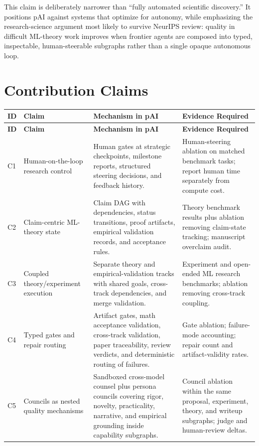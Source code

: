 \documentclass[11pt]{article}
\newcommand{\pai}{pAI}
\begin{document}
This claim is deliberately narrower than ``fully automated scientific discovery.'' It positions \pai{} against systems that optimize for autonomy, while emphasizing the research-science argument most likely to survive NeurIPS review: quality in difficult ML-theory work improves when frontier agents are composed into typed, inspectable, human-steerable subgraphs rather than a single opaque autonomous loop.

\section*{Contribution Claims}

\begin{longtable}{>{\raggedright\arraybackslash}p{} >{\raggedright\arraybackslash}p{} >{\raggedright\arraybackslash}p{} >{\raggedright\arraybackslash}p{}}
\toprule
\textbf{ID} & \textbf{Claim} & \textbf{Mechanism in \pai{}} & \textbf{Evidence Required} \\
\midrule
\endfirsthead
\toprule
\textbf{ID} & \textbf{Claim} & \textbf{Mechanism in \pai{}} & \textbf{Evidence Required} \\
\midrule
\endhead
C1 & Human-on-the-loop research control & Human gates at strategic checkpoints, milestone reports, structured steering decisions, and feedback history. & Human-steering ablation on matched benchmark tasks; report human time separately from compute cost. \\
C2 & Claim-centric ML-theory state & Claim DAG with dependencies, status transitions, proof artifacts, empirical validation records, and acceptance rules. & Theory benchmark results plus ablation removing claim-state tracking; manuscript overclaim audit. \\
C3 & Coupled theory/experiment execution & Separate theory and empirical-validation tracks with shared goals, cross-track dependencies, and merge validation. & Experiment and open-ended ML research benchmarks; ablation removing cross-track coupling. \\
C4 & Typed gates and repair routing & Artifact gates, math acceptance validation, cross-track validation, paper traceability, review verdicts, and deterministic routing of failures. & Gate ablation; failure-mode accounting; repair count and artifact-validity rates. \\
C5 & Councils as nested quality mechanisms & Sandboxed cross-model counsel plus persona councils covering rigor, novelty, practicality, narrative, and empirical grounding inside capability subgraphs. & Council ablation within the same proposal, experiment, theory, and writeup subgraphs; judge and human-review deltas. \\

\end{longtable}
\end{document}
